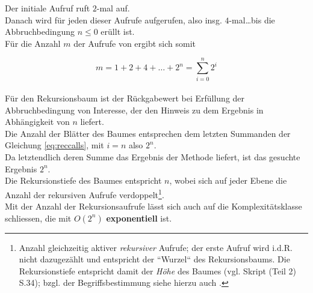 \noindent
Der initiale Aufruf  ruft $2$-mal  auf.\\
Danach wird für jeden dieser Aufrufe  aufgerufen, also insg. $4$-mal\ldots bis die Abbruchbedingung $n \leq 0$ erüllt ist.\\
Für die Anzahl $m$ der Aufrufe von  ergibt sich somit


\begin{equation}
     m = 1 + 2 + 4 + \dots + 2^n = \sum_{i=0}^n 2^i
    \label{eq:reccalls}
\end{equation}\\

\noindent
Für den Rekursionsbaum ist der Rückgabewert bei Erfüllung der Abbruchbedingung von Interesse, der den Hinweis zu dem Ergebnis in Abhängigkeit von $n$ liefert.\\
Die Anzahl der Blätter des Baumes entsprechen dem letzten Summanden der Gleichung \ref{eq:reccalls}, mit $i=n$
also $2^n$.\\
Da letztendlich deren Summe das Ergebnis der Methode  liefert, ist das gesuchte Ergebnis $2^n$.\\

\noindent
Die Rekursionstiefe des Baumes entspricht $n$, wobei sich auf jeder Ebene die Anzahl der rekursiven Aufrufe verdoppelt\footnote{
    Anzahl gleichzeitig aktiver \textit{rekursiver} Aufrufe; der erste Aufruf wird i.d.R. nicht dazugezählt und entspricht der ``Wurzel`` des Rekursionsbaums.
    Die Rekursionstiefe entspricht damit der \textit{Höhe} des Baumes (vgl. Skript (Teil 2) S.34); bzgl. der Begriffsbestimmung siehe hierzu auch \cite[144 f.]{CK75}.
}.\\
Mit der Anzahl der Rekursionsaufrufe lässt sich auch auf die Komplexitätsklasse schliessen, die mit $O(2^n)$ \textbf{exponentiell} ist.

